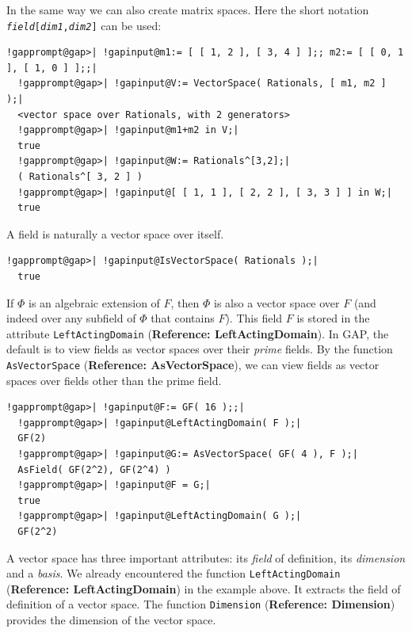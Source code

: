 \documentclass[a4paper,11pt]{report}
\begin{document}
{{ In the same way we can also create matrix spaces. Here the short notation \texttt{\mbox{\texttt{\mdseries\slshape field}}\texttt{}[\mbox{\texttt{\mdseries\slshape dim1}},\mbox{\texttt{\mdseries\slshape dim2}}]} can be used: 

 
\begin{Verbatim}[commandchars=!@|,fontsize=\small,frame=single,label=Example]
  !gapprompt@gap>| !gapinput@m1:= [ [ 1, 2 ], [ 3, 4 ] ];; m2:= [ [ 0, 1 ], [ 1, 0 ] ];;|
  !gapprompt@gap>| !gapinput@V:= VectorSpace( Rationals, [ m1, m2 ] );|
  <vector space over Rationals, with 2 generators>
  !gapprompt@gap>| !gapinput@m1+m2 in V;|
  true
  !gapprompt@gap>| !gapinput@W:= Rationals^[3,2];|
  ( Rationals^[ 3, 2 ] )
  !gapprompt@gap>| !gapinput@[ [ 1, 1 ], [ 2, 2 ], [ 3, 3 ] ] in W;|
  true
\end{Verbatim}
 

 A field is naturally a vector space over itself. 

 
\begin{Verbatim}[commandchars=!@|,fontsize=\small,frame=single,label=Example]
  !gapprompt@gap>| !gapinput@IsVectorSpace( Rationals );|
  true
\end{Verbatim}
 

 If $\Phi$ is an algebraic extension of $F$, then $\Phi$ is also a vector space over $F$ (and indeed over any subfield of $\Phi$ that contains $F$). This field $F$ is stored in the attribute \texttt{LeftActingDomain} (\textbf{Reference: LeftActingDomain}). In \textsf{GAP}, the default is to view fields as vector spaces over their \emph{prime} fields. By the function \texttt{AsVectorSpace} (\textbf{Reference: AsVectorSpace}), we can view fields as vector spaces over fields other than the prime field. 

 
\begin{Verbatim}[commandchars=!@|,fontsize=\small,frame=single,label=Example]
  !gapprompt@gap>| !gapinput@F:= GF( 16 );;|
  !gapprompt@gap>| !gapinput@LeftActingDomain( F );|
  GF(2)
  !gapprompt@gap>| !gapinput@G:= AsVectorSpace( GF( 4 ), F );|
  AsField( GF(2^2), GF(2^4) )
  !gapprompt@gap>| !gapinput@F = G;|
  true
  !gapprompt@gap>| !gapinput@LeftActingDomain( G );|
  GF(2^2)
\end{Verbatim}
 

 A vector space has three important attributes: its \emph{field} of definition, its \emph{dimension} and a \emph{basis}. We already encountered the function \texttt{LeftActingDomain} (\textbf{Reference: LeftActingDomain}) in the example above. It extracts the field of definition of a vector space.
The function \texttt{Dimension} (\textbf{Reference: Dimension}) provides the dimension of the vector space. 

}}
\end{document}
